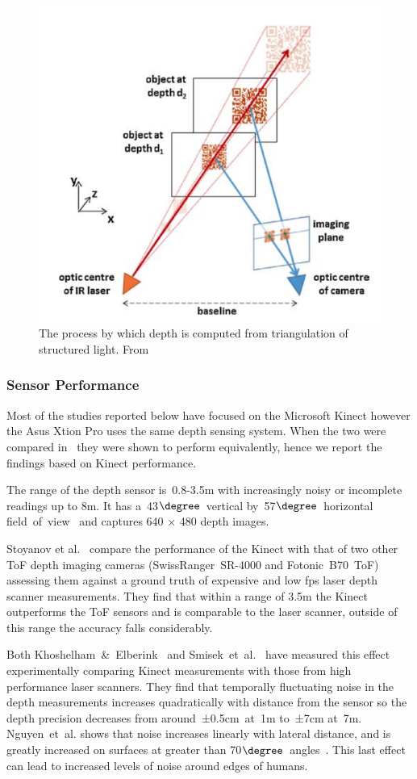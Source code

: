 \documentclass[11pt]{article} %
\begin{document}
\begin{figure}
\centering
\includegraphics*[width=0.45\linewidth,clip,trim={1.2cm 1cm 0.7cm 1.5cm}]{kinectMeasure}%
\caption{The process by which depth is computed from triangulation of structured light. From \cite{Han2013}		\label{fig:kinectMeasure}}
\end{figure}

\subsubsection{Sensor Performance}
\label{sec:senPerf}

Most of the studies reported below have focused on the Microsoft Kinect however the Asus Xtion Pro uses the same depth sensing system. When the two were compared in~\cite{Gonzalez-Jorge2013} they were shown to perform equivalently, hence we report the findings based on Kinect performance.

The range of the depth sensor is~0.8-3.5m with increasingly noisy or incomplete readings up to 8m. It has a~43$\degree$~vertical by~57$\degree$~horizontal field~of~view~\cite{Han2013} and captures 640 $\times$ 480 depth images.

Stoyanov et al.~\cite{StoyanovTodorandLouloudiAthanasiaandAndreassonHenrikandLilienthal2011a} compare the performance of the Kinect with that of two other ToF depth imaging cameras (SwissRanger~SR-4000 and Fotonic~B70~ToF) assessing them against a ground truth of expensive and low fps laser depth scanner measurements. They find that within a range of 3.5m the Kinect outperforms the ToF sensors and is comparable to the laser scanner, outside of this range the accuracy falls considerably.

Both Khoshelham~\&~Elberink~\cite{Khoshelham2012a} and Smisek~et~al.~\cite{Smisek2011} have measured this effect experimentally comparing Kinect measurements with those from high performance laser scanners. They find that temporally fluctuating noise in the depth measurements increases quadratically with distance from the sensor so the depth precision decreases from around~±0.5cm~at~1m to~±7cm at~7m. Nguyen~et~al. shows that noise increases linearly with lateral distance, and is greatly increased on surfaces at greater than 70$\degree$~angles~\cite{Nguyen2012}. This last effect can lead to increased levels of noise around edges of humans. 
\end{document}
